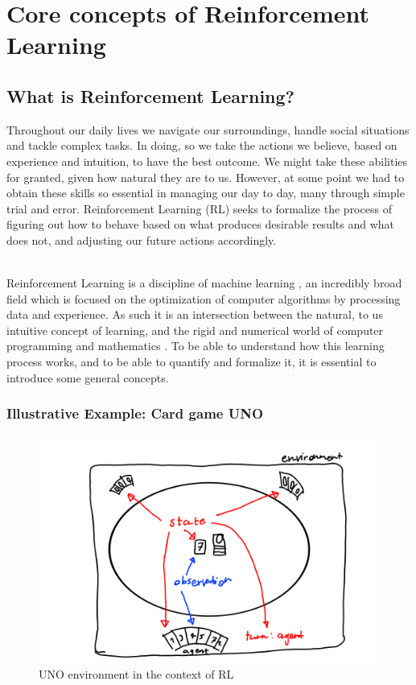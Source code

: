 \chapter{Core concepts of Reinforcement Learning}\label{chap:theory}
\section{What is Reinforcement Learning?}\label{sec:RL}
\noindent
Throughout our daily lives we navigate our surroundings, handle social situations and tackle complex tasks. In doing, so we take the actions we believe, based on experience and intuition, to have the best outcome. We might take these abilities for granted, given how natural they are to us. However, at some point we had to obtain these skills so essential in managing our day to day, many through simple trial and error. Reinforcement Learning (RL) seeks to formalize the process of figuring out how to behave based on what produces desirable results and what does not, and adjusting our future actions accordingly. 

\noindent
\\ Reinforcement Learning is a discipline of machine learning \cite[p. 1]{sutton_reinforcement_2018}, an incredibly broad field which is focused on the optimization of computer algorithms by processing data and experience. As such it is an intersection between the natural, to us intuitive concept of learning, and the rigid and numerical world of computer programming and mathematics \cite[p. 4]{sutton_reinforcement_2018}. To be able to understand how this learning process works, and to be able to quantify and formalize it, it is essential to introduce some general concepts. 

\subsection{Illustrative Example: Card game UNO}\label{subsec:UNO}

\begin{figure}[ht]
    \centering
    \includegraphics[width=\linewidth]{figures/UNO.png}
    \caption{UNO environment in the context of RL}
    \label{fig:UNO}
\end{figure}


